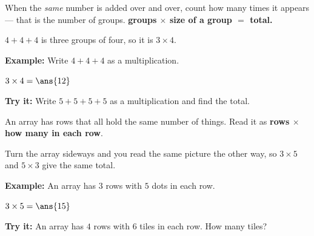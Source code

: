 \documentclass[12pt]{article}
\begin{document}


\begin{formulabox}
When the \emph{same} number is added over and over, count how many times it
appears --- that is the number of groups. \quad
\textbf{groups $\times$ size of a group $=$ total.}\par
$4 + 4 + 4$ is three groups of four, so it is $3 \times 4$.
\end{formulabox}

\begin{examplebox}
\textbf{Example:} \quad Write $4 + 4 + 4$ as a multiplication.

$3 \times 4 = \ans{12}$
\end{examplebox}

\begin{tryitbox}
\textbf{Try it:} \quad Write $5 + 5 + 5 + 5$ as a multiplication and find the
total.\\[2pt]
\end{tryitbox}


\begin{formulabox}
An array has rows that all hold the same number of things. Read it as
\textbf{rows $\times$ how many in each row}.\par
Turn the array sideways and you read the same picture the other way, so
$3 \times 5$ and $5 \times 3$ give the same total.
\end{formulabox}

\begin{examplebox}
\textbf{Example:} \quad An array has $3$ rows with $5$ dots in each row.

$3 \times 5 = \ans{15}$
\end{examplebox}

\begin{tryitbox}
\textbf{Try it:} \quad An array has $4$ rows with $6$ tiles in each row. How
many tiles?\\[2pt]
\end{tryitbox}
\end{document}
